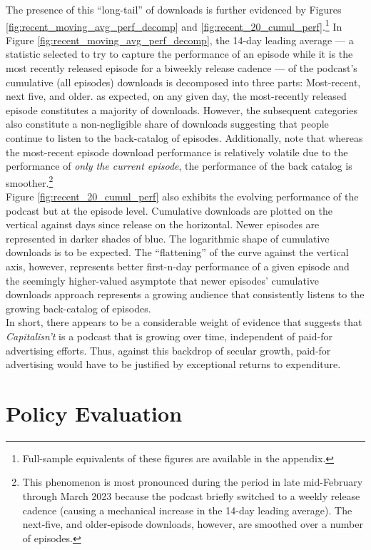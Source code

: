 \documentclass[11pt, letterpaper, twoside]{article}
\begin{document}
The presence of this ``long-tail'' of downloads is further evidenced by Figures \ref{fig:recent_moving_avg_perf_decomp} and \ref{fig:recent_20_cumul_perf}.\footnote{Full-sample equivalents of these figures are available in the appendix.} In Figure \ref{fig:recent_moving_avg_perf_decomp}, the 14-day leading average --- a statistic selected to try to capture the performance of an episode while it is the most recently released episode for a biweekly release cadence --- of the podcast's cumulative (all episodes) downloads is decomposed into three parts: Most-recent, next five, and older. as expected, on any given day, the most-recently released episode constitutes a majority of downloads. However, the subsequent categories also constitute a non-negligible share of downloads suggesting that people continue to listen to the back-catalog of episodes. Additionally, note that whereas the most-recent episode download performance is relatively volatile due to the performance of \textit{only the current episode}, the performance of the back catalog is smoother.\footnote{This phenomenon is most pronounced during the period in late mid-February through March 2023 because the podcast briefly switched to a weekly release cadence (causing a mechanical increase in the 14-day leading average). The next-five, and older-episode downloads, however, are smoothed over a number of episodes.}\\

Figure \ref{fig:recent_20_cumul_perf} also exhibits the evolving performance of the podcast but at the episode level. Cumulative downloads are plotted on the vertical against days since release on the horizontal. Newer episodes are represented in darker shades of blue. The logarithmic shape of cumulative downloads is to be expected. The ``flattening'' of the curve against the vertical axis, however, represents better first-n-day performance of a given episode and the seemingly higher-valued asymptote that newer episodes' cumulative downloads approach represents a growing audience that consistently listens to the growing back-catalog of episodes.\\

In short, there appears to be a considerable weight of evidence that suggests that \textit{Capitalisn't} is a podcast that is growing over time, independent of paid-for advertising efforts. Thus, against this backdrop of secular growth, paid-for advertising would have to be justified by exceptional returns to expenditure.

\section{Policy Evaluation}
\end{document}
